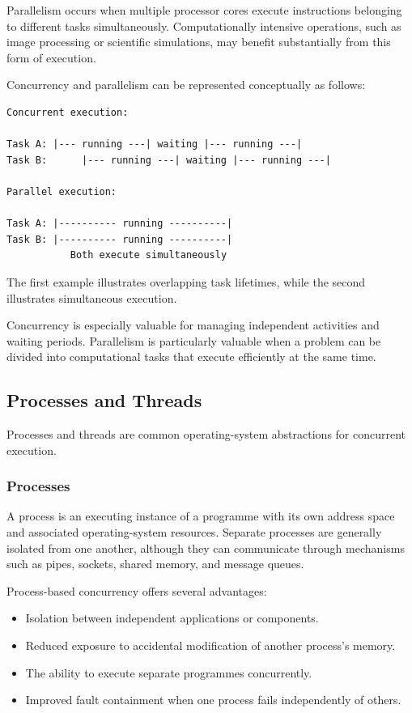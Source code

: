 Parallelism occurs when multiple processor cores execute instructions belonging to different tasks simultaneously. Computationally intensive operations, such as image processing or scientific simulations, may benefit substantially from this form of execution.

Concurrency and parallelism can be represented conceptually as follows:

\begin{lstlisting}
Concurrent execution:

Task A: |--- running ---| waiting |--- running ---|
Task B:      |--- running ---| waiting |--- running ---|

Parallel execution:

Task A: |---------- running ----------|
Task B: |---------- running ----------|
           Both execute simultaneously
\end{lstlisting}

The first example illustrates overlapping task lifetimes, while the second illustrates simultaneous execution.

Concurrency is especially valuable for managing independent activities and waiting periods. Parallelism is particularly valuable when a problem can be divided into computational tasks that execute efficiently at the same time.

\subsection{Processes and Threads}

Processes and threads are common operating-system abstractions for concurrent execution.

\subsubsection{Processes}

A process is an executing instance of a programme with its own address space and associated operating-system resources. Separate processes are generally isolated from one another, although they can communicate through mechanisms such as pipes, sockets, shared memory, and message queues.

Process-based concurrency offers several advantages:

\begin{itemize}
    \item Isolation between independent applications or components.
    \item Reduced exposure to accidental modification of another process's memory.
    \item The ability to execute separate programmes concurrently.
    \item Improved fault containment when one process fails independently of others.
\end{itemize}

